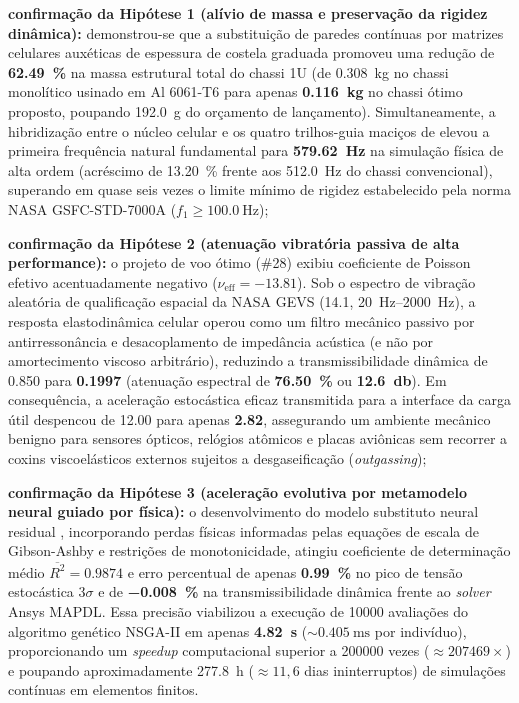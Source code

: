 \begin{alineas}
  \item \textbf{confirmação da Hipótese 1 (alívio de massa e preservação da rigidez dinâmica):} demonstrou-se que a substituição de paredes contínuas por matrizes celulares auxéticas de espessura de costela graduada promoveu uma redução de \textbf{\SI{62.49}{\percent}} na massa estrutural total do chassi 1U (de \SI{0.308}{\kilo\gram} no chassi monolítico usinado em Al 6061-T6 para apenas \textbf{\SI{0.116}{\kilo\gram}} no chassi ótimo proposto, poupando \SI{192.0}{\gram} do orçamento de lançamento). Simultaneamente, a hibridização entre o núcleo celular e os quatro trilhos-guia maciços de \rail{} elevou a primeira frequência natural fundamental para \textbf{\SI{579.62}{\hertz}} na simulação física de alta ordem (acréscimo de \SI{+13.20}{\percent} frente aos \SI{512.0}{\hertz} do chassi convencional), superando em quase seis vezes o limite mínimo de rigidez estabelecido pela norma NASA GSFC-STD-7000A ($f_1 \ge \SI{100.0}{\hertz}$);
  
  \item \textbf{confirmação da Hipótese 2 (atenuação vibratória passiva de alta performance):} o projeto de voo ótimo (\#28) exibiu coeficiente de Poisson efetivo acentuadamente negativo ($\nu_{\text{eff}} = \num{-13.81}$). Sob o espectro de vibração aleatória de qualificação espacial da NASA GEVS (\SI{14.1}{\Grms}, \SIrange{20}{2000}{\hertz}), a resposta elastodinâmica celular operou como um filtro mecânico passivo por antirressonância e desacoplamento de impedância acústica (e não por amortecimento viscoso arbitrário), reduzindo a transmissibilidade dinâmica de \num{0.850} para \textbf{\num{0.1997}} (atenuação espectral de \textbf{\SI{76.50}{\percent}} ou \textbf{\SI{12.6}{\decibel}}). Em consequência, a aceleração estocástica eficaz transmitida para a interface da carga útil despencou de \SI{12.00}{\Grms} para apenas \textbf{\SI{2.82}{\Grms}}, assegurando um ambiente mecânico benigno para sensores ópticos, relógios atômicos e placas aviônicas sem recorrer a coxins viscoelásticos externos sujeitos a desgaseificação (\textit{outgassing});
  
  \item \textbf{confirmação da Hipótese 3 (aceleração evolutiva por metamodelo neural guiado por física):} o desenvolvimento do modelo substituto neural residual , incorporando perdas físicas informadas pelas equações de escala de Gibson-Ashby e restrições de monotonicidade, atingiu coeficiente de determinação médio $\overline{R^2} = \num{0.9874}$ e erro percentual de apenas \textbf{\SI{+0.99}{\percent}} no pico de tensão estocástica $3\sigma$ e de \textbf{\SI{-0.008}{\percent}} na transmissibilidade dinâmica frente ao \textit{solver} Ansys MAPDL. Essa precisão viabilizou a execução de \num{10000} avaliações do algoritmo genético NSGA-II em apenas \textbf{\SI{4.82}{\second}} ($\sim \SI{0.405}{\milli\second}$ por indivíduo), proporcionando um \textit{speedup} computacional superior a \num{200000} vezes ($\approx \num{207469}\times$) e poupando aproximadamente \SI{277.8}{\hour} ($\approx 11{,}6$ dias ininterruptos) de simulações contínuas em elementos finitos.
\end{alineas}

